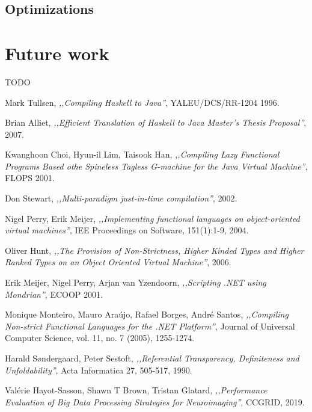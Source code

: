 \documentclass[en]{pracamgr}
\begin{document}
\section{Optimizations}

\chapter{Future work}\label{r:future}

TODO


\begin{thebibliography}{99}

 Mark Tullsen, \textit{,,Compiling Haskell to Java''}, YALEU/DCS/RR-1204
1996.

 Brian Alliet, \textit{,,Efficient Translation of Haskell to Java
Master’s Thesis Proposal''}, 2007.

 Kwanghoon Choi, Hyun-il Lim, Taisook Han, \textit{,,Compiling Lazy Functional Programs Based othe Spineless Tagless G-machine for the Java Virtual Machine''}, FLOPS 2001.

 Don Stewart, \textit{,,Multi-paradigm just-in-time compilation''}, 2002.

 Nigel Perry, Erik Meijer, \textit{,,Implementing functional languages on object-oriented virtual machines''}, IEE Proceedings on Software, 151(1):1-9, 2004.

 Oliver Hunt, \textit{,,The Provision of Non-Strictness, Higher Kinded Types
and Higher Ranked Types on an Object Oriented Virtual Machine''}, 2006.

 Erik Meijer, Nigel Perry, Arjan van Yzendoorn, \textit{,,Scripting .NET using Mondrian''}, ECOOP 2001.

 Monique Monteiro, Mauro Ara\'ujo, Rafael Borges, Andr\'e Santos,  \textit{,,Compiling Non-strict Functional Languages for the .NET Platform''}, Journal of Universal Computer Science, vol. 11, no. 7 (2005), 1255-1274.

 Harald Søndergaard, Peter Sestoft, \textit{,,Referential Transparency, Definiteness and Unfoldability''}, Acta Informatica 27, 505-517, 1990.

 Val\'erie Hayot-Sasson, Shawn T Brown, Tristan Glatard, \textit{,,Performance Evaluation of Big Data Processing Strategies for Neuroimaging''}, CCGRID, 2019.


\end{thebibliography}
\end{document}
